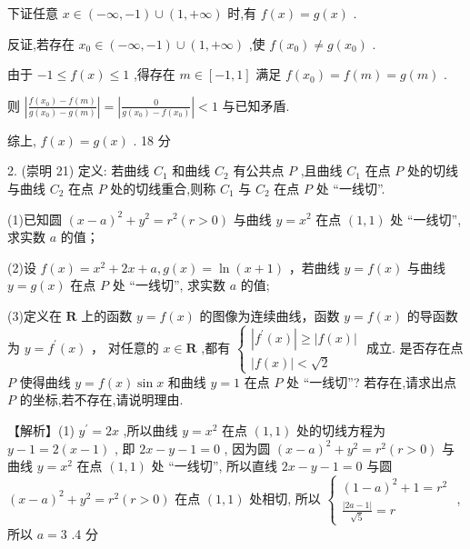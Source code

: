 \documentclass[10pt]{article}
\newcommand*\circled[1]{\tikz[baseline=(char.base)]{\node[shape=circle,draw,inner sep=1.5pt] (char) {\small #1};}}
\begin{document}
 \circled{3}  下证任意 \(x \in  \left( {-\infty , - 1}\right)  \cup  \left( {1, + \infty }\right)\) 时,有 \(f\left( x\right)  = g\left( x\right)\) .

反证,若存在 \({x}_{0} \in  \left( {-\infty , - 1}\right)  \cup  \left( {1, + \infty }\right)\) ,使 \(f\left( {x}_{0}\right)  \neq  g\left( {x}_{0}\right)\) .

由于 \(- 1 \leq  f\left( x\right)  \leq  1\) ,得存在 \(m \in  \left\lbrack  {-1,1}\right\rbrack\) 满足 \(f\left( {x}_{0}\right)  = f\left( m\right)  = g\left( m\right)\) .

则 \(\left| \frac{f\left( {x}_{0}\right)  - f\left( m\right) }{g\left( {x}_{0}\right)  - g\left( m\right) }\right|  = \left| \frac{0}{g\left( {x}_{0}\right)  - f\left( {x}_{0}\right) }\right|  < 1\) 与已知矛盾.

综上, \(f\left( x\right)  = g\left( x\right)\) . 18 分

2. (崇明 21) 定义: 若曲线 \({C}_{1}\) 和曲线 \({C}_{2}\) 有公共点 \(P\) ,且曲线 \({C}_{1}\) 在点 \(P\) 处的切线与曲线 \({C}_{2}\) 在点 \(P\) 处的切线重合,则称 \({C}_{1}\) 与 \({C}_{2}\) 在点 \(P\) 处 “一线切”.

(1)已知圆 \({\left( x - a\right) }^{2} + {y}^{2} = {r}^{2}\left( {r > 0}\right)\) 与曲线 \(y = {x}^{2}\) 在点 \(\left( {1,1}\right)\) 处 “一线切”,求实数 \(a\) 的值；

(2)设 \(f\left( x\right)  = {x}^{2} + {2x} + a,g\left( x\right)  = \ln \left( {x + 1}\right)\) ，若曲线 \(y = f\left( x\right)\) 与曲线 \(y = g\left( x\right)\) 在点 \(P\) 处 “一线切”, 求实数 \(a\) 的值;

(3)定义在 \(\mathbf{R}\) 上的函数 \(y = f\left( x\right)\) 的图像为连续曲线，函数 \(y = f\left( x\right)\) 的导函数为 \(y = {f}^{\prime }\left( x\right)\) ， 对任意的 \(x \in  \mathbf{R}\) ,都有 \(\left\{  \begin{array}{l} \left| {{f}^{\prime }\left( x\right) }\right|  \geq  \left| {f\left( x\right) }\right| \\  \left| {f\left( x\right) }\right|  < \sqrt{2} \end{array}\right.\) 成立. 是否存在点 \(P\) 使得曲线 \(y = f\left( x\right) \sin x\) 和曲线 \(y = 1\) 在点 \(P\) 处 “一线切”? 若存在,请求出点 \(P\) 的坐标,若不存在,请说明理由.

【解析】(1) \({y}^{\prime } = {2x}\) ,所以曲线 \(y = {x}^{2}\) 在点 \(\left( {1,1}\right)\) 处的切线方程为 \(y - 1 = 2\left( {x - 1}\right)\) , 即 \({2x} - y - 1 = 0\) , 因为圆 \({\left( x - a\right) }^{2} + {y}^{2} = {r}^{2}\left( {r > 0}\right)\) 与曲线 \(y = {x}^{2}\) 在点 \(\left( {1,1}\right)\) 处 “一线切”, 所以直线 \({2x} - y - 1 = 0\) 与圆 \({\left( x - a\right) }^{2} + {y}^{2} = {r}^{2}\left( {r > 0}\right)\) 在点 \(\left( {1,1}\right)\) 处相切, 所以 \(\left\{  \begin{array}{l} {\left( 1 - a\right) }^{2} + 1 = {r}^{2} \\  \frac{\left| 2a - 1\right| }{\sqrt{5}} = r \end{array}\right.\) ,所以 \(a = 3\) .4 分
\end{document}
